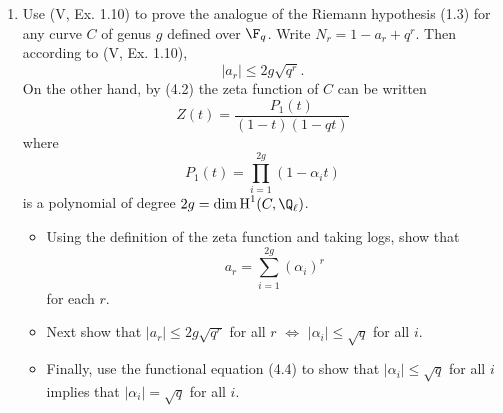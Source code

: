 \documentclass[a4paper]{article}
\begin{document}
\begin{enumerate} [label=\textbf{\arabic*.}, leftmargin=0em]
      \item Use (V, Ex. 1.10) to prove the analogue of the Riemann hypothesis (1.3) for any curve $C$ of genus $g$ defined over $\F_q$.
      Write $N_r = 1 - a_r + q^r$.
      Then according to (V, Ex. 1.10),
      \begin{equation*}
            |a_r| \leq 2g \sqrt{q^r}.
      \end{equation*}
      On the other hand, by (4.2) the zeta function of $C$ can be written
      \begin{equation*}
            Z(t) = \frac{P_1(t)}{(1 - t)(1 - qt)}
      \end{equation*}
      where
      \begin{equation*}
            P_1(t) = \prod_{i = 1}^{2g} (1 - \alpha_i t)
      \end{equation*}
      is a polynomial of degree $2g = \dim \cH^1(C, \Q_\ell)$.

      \begin{itemize}
            \item[(a)] Using the definition of the zeta function and taking logs, show that
            \begin{equation*}
                  a_r = \sum_{i = 1}^{2g} (\alpha_i)^r
            \end{equation*}
            for each $r$.

            \item[(b)] Next show that $|a_r| \leq 2g \sqrt{q^r}$ for all $r$ $\iff$ $|\alpha_i| \leq \sqrt{q}$ for all $i$.

            \item[(c)] Finally, use the functional equation (4.4) to show that $|\alpha_i| \leq \sqrt{q}$ for all $i$ implies that $|\alpha_i| = \sqrt{q}$ for all $i$.
      \end{itemize}


\end{enumerate}
\end{document}
